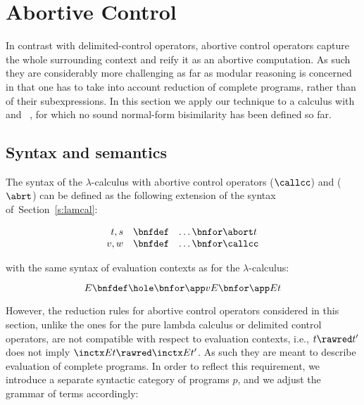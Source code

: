 \documentclass{lmcs}
\theoremstyle{defC}
\begin{document}
\section{Abortive Control}%
\label{s:abortcon}

In contrast with delimited-control operators, abortive control
operators capture the whole surrounding context and reify it as an
abortive computation. As such they are considerably more challenging
as far as modular reasoning is concerned in that one has to take into
account reduction of complete programs, rather than of their
subexpressions. In this section we apply our technique to a calculus
with \textcallcc and
\textabort~\cite{Felleisen-Friedman:FDPC3,Felleisen-Hieb:TCS92}, for
which no sound normal-form bisimilarity has been defined so far.

\subsection{Syntax and semantics}%
\label{ssec:syntax-lac}

The syntax of the $\lambda$-calculus with abortive control operators
\textcallcc ($\callcc$) and \textabort ($\abrt$) can be defined as the
following extension of the syntax of~Section~\ref{s:lamcal}:

\[
\begin{array}{rcl}
  t, s & \bnfdef & \ldots \bnfor \abort t
  \\
  v,w & \bnfdef & \ldots \bnfor \callcc
\end{array}
\]

\vspace{2mm}\noindent with the same syntax of evaluation contexts as
for the $\lambda$-calculus:

\[
  E \bnfdef \hole \bnfor \app v E \bnfor \app E t
\]

\vspace{2mm}\noindent However, the reduction rules for abortive
control operators considered in this section, unlike the ones for the
pure lambda calculus or delimited control operators, are not
compatible with respect to evaluation contexts, i.e., $t \rawred t'$
does not imply $\inctx E t \rawred \inctx E {t'}$. As such they are
meant to describe evaluation of complete programs. In order to reflect
this requirement, we introduce a separate syntactic category of
programs $p$, and we adjust the grammar of terms accordingly:
\end{document}
